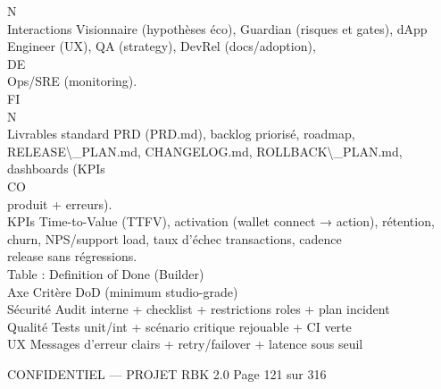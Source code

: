 \documentclass[12pt,landscape,a4paper]{article}
\newenvironment{confidential}
{\begin{tcolorbox}[
    colback=rbkred!5!white,
    colframe=rbkred!75!black,
    title=CONFIDENTIEL,
    fonttitle=\bfseries\color{white},
    coltitle=rbkred!75!black,
    breakable,
    enhanced,
    frame hidden,
    borderline west={2pt}{0pt}{rbkred!75!black}
]}
{\end{tcolorbox}}
\begin{document}
\vspace{0.5em}
\vspace{0.5em}
\vspace{0.5em}
N\\
Interactions Visionnaire (hypothèses éco), Guardian (risques et gates), dApp Engineer (UX), QA (strategy), DevRel (docs/adoption),\\
\vspace{0.5em}
\vspace{0.5em}
\vspace{0.5em}
\vspace{0.5em}
DE\\
Ops/SRE (monitoring).\\
\vspace{0.5em}
\vspace{0.5em}
\vspace{0.5em}
\vspace{0.5em}
FI\\
N\\
Livrables standard    PRD (PRD.md), backlog priorisé, roadmap, RELEASE\textbackslash{}_PLAN.md, CHANGELOG.md, ROLLBACK\textbackslash{}_PLAN.md, dashboards (KPIs\\
CO\\
produit + erreurs).\\
\vspace{0.5em}
KPIs Time-to-Value (TTFV), activation (wallet connect → action), rétention, churn, NPS/support load, taux d’échec transactions, cadence\\
release sans régressions.\\
\vspace{0.5em}
Table : Definition of Done (Builder)\\
\vspace{0.5em}
Axe      Critère DoD (minimum studio-grade)\\
Sécurité Audit interne + checklist + restrictions roles + plan incident\\
Qualité Tests unit/int + scénario critique rejouable + CI verte\\
UX       Messages d’erreur clairs + retry/failover + latence sous seuil\\
\vspace{0.5em}
\vspace{0.5em}
\vspace{0.5em}
\begin{confidential}CONFIDENTIEL — PROJET RBK 2.0                                    Page 121 sur 316\end{confidential}
\end{document}
